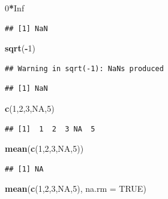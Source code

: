 \documentclass[
]{book}
\newenvironment{Shaded}{\begin{snugshade}}{\end{snugshade}}
\newcommand{\AttributeTok}[1]{\textcolor[rgb]{0.13,0.29,0.53}{#1}}
\newcommand{\ConstantTok}[1]{\textcolor[rgb]{0.56,0.35,0.01}{#1}}
\newcommand{\DecValTok}[1]{\textcolor[rgb]{0.00,0.00,0.81}{#1}}
\newcommand{\FunctionTok}[1]{\textcolor[rgb]{0.13,0.29,0.53}{\textbf{#1}}}
\newcommand{\NormalTok}[1]{#1}
\newcommand{\SpecialCharTok}[1]{\textcolor[rgb]{0.81,0.36,0.00}{\textbf{#1}}}
\begin{document}
\begin{Shaded}
\begin{Highlighting}[]
\DecValTok{0}\SpecialCharTok{*}\ConstantTok{Inf}
\end{Highlighting}
\end{Shaded}

\begin{verbatim}
## [1] NaN
\end{verbatim}

\begin{Shaded}
\begin{Highlighting}[]
\FunctionTok{sqrt}\NormalTok{(}\SpecialCharTok{{-}}\DecValTok{1}\NormalTok{)}
\end{Highlighting}
\end{Shaded}

\begin{verbatim}
## Warning in sqrt(-1): NaNs produced
\end{verbatim}

\begin{verbatim}
## [1] NaN
\end{verbatim}

\begin{Shaded}
\begin{Highlighting}[]
\FunctionTok{c}\NormalTok{(}\DecValTok{1}\NormalTok{,}\DecValTok{2}\NormalTok{,}\DecValTok{3}\NormalTok{,}\ConstantTok{NA}\NormalTok{,}\DecValTok{5}\NormalTok{)}
\end{Highlighting}
\end{Shaded}

\begin{verbatim}
## [1]  1  2  3 NA  5
\end{verbatim}

\begin{Shaded}
\begin{Highlighting}[]
\FunctionTok{mean}\NormalTok{(}\FunctionTok{c}\NormalTok{(}\DecValTok{1}\NormalTok{,}\DecValTok{2}\NormalTok{,}\DecValTok{3}\NormalTok{,}\ConstantTok{NA}\NormalTok{,}\DecValTok{5}\NormalTok{))}
\end{Highlighting}
\end{Shaded}

\begin{verbatim}
## [1] NA
\end{verbatim}

\begin{Shaded}
\begin{Highlighting}[]
\FunctionTok{mean}\NormalTok{(}\FunctionTok{c}\NormalTok{(}\DecValTok{1}\NormalTok{,}\DecValTok{2}\NormalTok{,}\DecValTok{3}\NormalTok{,}\ConstantTok{NA}\NormalTok{,}\DecValTok{5}\NormalTok{), }\AttributeTok{na.rm =} \ConstantTok{TRUE}\NormalTok{)}
\end{Highlighting}
\end{Shaded}
\end{document}
